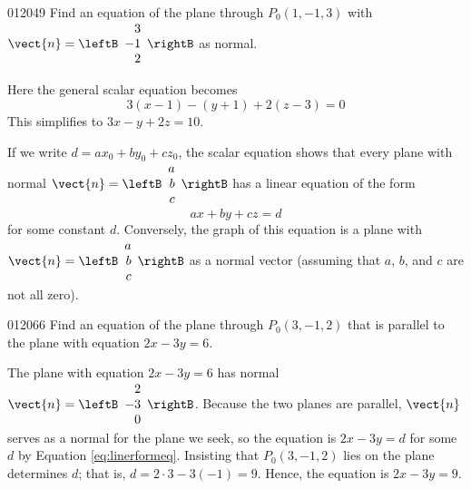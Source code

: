 \begin{example}{}{012049}
Find an equation of the plane through $P_{0}(1, -1, 3)$ with $\vect{n} = \leftB
\begin{array}{r}
3\\
-1\\
2
\end{array}
\rightB$
 as normal.


\begin{solution}
  Here the general scalar equation becomes
\begin{equation*}
3(x - 1) - (y + 1) + 2(z - 3) = 0
\end{equation*}
This simplifies to $3x - y + 2z = 10$.
\end{solution}
\end{example}

If we write $d = ax_{0} + by_{0} + cz_{0}$, the scalar equation shows that every plane with normal $\vect{n} = \leftB
\begin{array}{r}
a\\
b\\
c
\end{array}
\rightB$
 has a linear equation of the form
\begin{equation} \label{eq:linerformeq} 
ax + by + cz = d
\end{equation}
for some constant $d$. Conversely, the graph of this equation is a plane with $\vect{n} = \leftB
\begin{array}{r}
a\\
b\\
c
\end{array}
\rightB$ as a normal vector (assuming that $a$, $b$, and $c$ are not all zero).


\begin{example}{}{012066}
Find an equation of the plane through $P_{0}(3, -1, 2)$ that is parallel to the plane with equation $2x - 3y = 6$.


\begin{solution}
The plane with equation $2x -3y = 6$ has normal $\vect{n} = \leftB
\begin{array}{r}
2\\
-3\\
0
\end{array}
\rightB$. Because the two planes are parallel, $\vect{n}$ serves as a normal for the plane we seek, so the equation is $2x - 3y = d$ for some $d$ by Equation \ref{eq:linerformeq}. Insisting that $P_{0}(3, -1, 2)$ lies on the plane determines $d$; that is, $d = 2 \cdot 3 - 3(-1) = 9$. Hence, the equation is $2x - 3y = 9$.
\end{solution}
\end{example}

